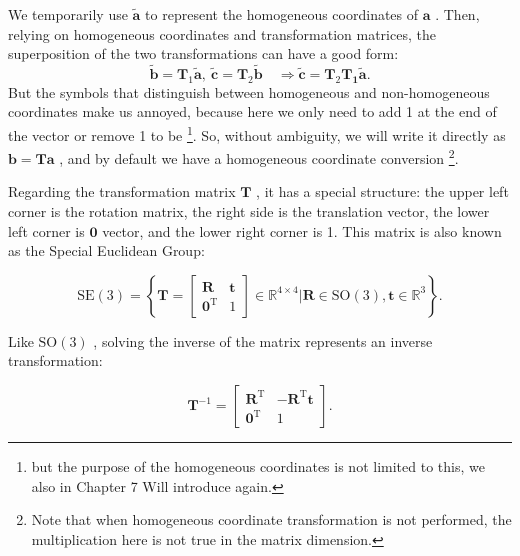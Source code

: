 We temporarily use $  \tilde { \bm {a} } $ to represent the homogeneous coordinates of $ \bm {a} $ . Then, relying on homogeneous coordinates and transformation matrices, the superposition of the two transformations can have a good form:
\begin{equation}
	\tilde{\bm{b}} = \bm{T}_1 \tilde{\bm{a}}, \  \tilde{\bm{c}} = \bm{T}_2 \tilde{\bm{b}} \quad \Rightarrow \tilde{\bm{c}} = \bm{T}_2 \bm{T_1} \tilde{\bm{a}}.
\end{equation}
But the symbols that distinguish between homogeneous and non-homogeneous coordinates make us annoyed, because here we only need to add 1 at the end of the vector or remove 1 to be \footnote {but the purpose of the homogeneous coordinates is not limited to this, we also in Chapter 7 Will introduce again. }. So, without ambiguity, we will write it directly as $ \bm {b}= \bm {T} \bm {a} $ , and by default we have a homogeneous coordinate conversion \footnote { Note that when homogeneous coordinate transformation is not performed, the multiplication here is not true in the matrix dimension. }.

Regarding the transformation matrix $ \bm{T} $ , it has a special structure: the upper left corner is the rotation matrix, the right side is the translation vector, the lower left corner is $ \bm{0} $ vector, and the lower right corner is 1. This matrix is also known as the Special Euclidean Group:

\begin{equation}
\mathrm{SE}(3) = \left\{ \bm{T} = \left[ {\begin{array}{*{20}{c}}
	\bm{R} & \bm{t} \\
	{{\bm{0}^\mathrm{T}}} & 1
	\end{array}} \right]
\in \mathbb{R}^{4 \times 4} | \bm{R} \in \mathrm{SO}(3), \bm{t} \in \mathbb{R}^3\right\} .
\end{equation}

Like $ \mathrm{SO}( 3 ) $ , solving the inverse of the matrix represents an inverse transformation:

\begin{equation}
{ \bm{T}^{ - 1}} = \left[ {\begin{array}{*{20}{c}}
	{{\bm{R}^\mathrm{T}}}&{ - {\bm{R}^\mathrm{T}}\bm{t}}\\
	{{\bm{0}^\mathrm{T}}}&1
	\end{array}} \right].
\end{equation}

